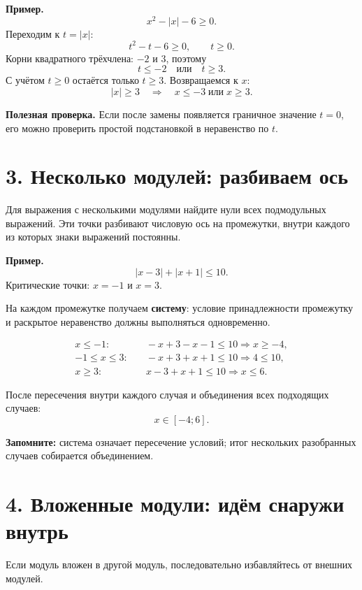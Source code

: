 \documentclass[a4paper,12pt]{article}
\newcommand{\sectionline}{\par\vspace{0.25em}{\color{accent}\hrule height 0.7pt}\vspace{0.7em}}
\begin{document}
\textbf{Пример.}
\[
 x^2-|x|-6\ge0.
\]
Переходим к $t=|x|$:
\[
 t^2-t-6\ge0,\qquad t\ge0.
\]
Корни квадратного трёхчлена: $-2$ и $3$, поэтому
\[
 t\le-2\quad\text{или}\quad t\ge3.
\]
С учётом $t\ge0$ остаётся только $t\ge3$. Возвращаемся к $x$:
\[
 |x|\ge3\quad\Longrightarrow\quad x\le-3\;\text{или}\;x\ge3.
\]

\textbf{Полезная проверка.} Если после замены появляется граничное значение $t=0$, его можно проверить простой подстановкой в неравенство по $t$.

\section*{3. Несколько модулей: разбиваем ось}
\sectionline
Для выражения с несколькими модулями найдите нули всех подмодульных выражений. Эти точки разбивают числовую ось на промежутки, внутри каждого из которых знаки выражений постоянны.

\textbf{Пример.}
\[
 |x-3|+|x+1|\le10.
\]
Критические точки: $x=-1$ и $x=3$.

\begin{center}
\end{center}

На каждом промежутке получаем \textbf{систему}: условие принадлежности промежутку и раскрытое неравенство должны выполняться одновременно.

\begin{align*}
 x\le-1:&\quad -x+3-x-1\le10 \Longrightarrow x\ge-4,\\
 -1\le x\le3:&\quad -x+3+x+1\le10 \Longrightarrow 4\le10,\\
 x\ge3:&\quad x-3+x+1\le10 \Longrightarrow x\le6.
\end{align*}

После пересечения внутри каждого случая и объединения всех подходящих случаев:
\[
 x\in[-4;6].
\]

\textbf{Запомните:} система означает пересечение условий; итог нескольких разобранных случаев собирается объединением.

\section*{4. Вложенные модули: идём снаружи внутрь}
\sectionline
Если модуль вложен в другой модуль, последовательно избавляйтесь от внешних модулей.
\end{document}
